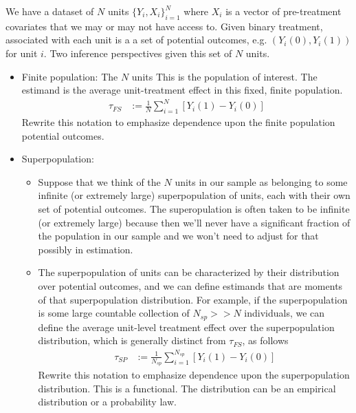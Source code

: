 \documentclass[12pt]{article}
\theoremstyle{plain}
\theoremstyle{definition}
\theoremstyle{remark}
\newcommand{\sumiN}{\sum^N_{i=1}}
\begin{document}
We have a dataset of $N$ units $\{Y_i,X_i\}_{i=1}^N$ where
$X_i$ is a vector of pre-treatment covariates that we may or may not
have access to.
Given binary treatment,
associated with each unit is a a set of potential outcomes,
e.g. $(Y_i(0),Y_i(1))$ for unit $i$.
Two inference perspectives given this set of $N$ units.
\begin{itemize}
  \item Finite population:
    The $N$ units
    This is the population of interest.
    The estimand is the average unit-treatment effect in this fixed,
    finite population.
    \begin{align*}
      \tau_{FS}
      &:=
      \frac{1}{N}
      \sumiN
      [Y_i(1)-Y_i(0)]
    \end{align*}
    Rewrite this notation to emphasize dependence upon the finite
    population potential outcomes.

  \item
    Superpopulation:
    \begin{itemize}
      \item Suppose that we think of the $N$ units in our sample as
        belonging to some infinite (or extremely large) superpopulation
        of units, each with their own set of potential outcomes.
        The superopulation is often taken to be infinite (or extremely
        large) because then we'll never have a significant fraction of
        the population in our sample and we won't need to adjust for
        that possibly in estimation.

      \item
        The superpopulation of units can be characterized by their
        distribution over potential outcomes, and we can define
        estimands that are moments of that superpopulation distribution.
        For example, if the superpopulation is some large countable
        collection of $N_{sp}>>N$ individuals, we can define the average
        unit-level treatment effect over the superpopulation
        distribution, which is generally distinct from $\tau_{FS}$, as
        follows
        \begin{align*}
          \tau_{SP}
          &:=
          \frac{1}{N_{sp}}
          \sum_{i=1}^{N_{sp}}
          [Y_i(1)-Y_i(0)]
        \end{align*}
        Rewrite this notation to emphasize dependence upon the
        superpopulation distribution. This is a functional.
        The distribution can be an empirical distribution or a
        probability law.


\end{itemize}
\end{itemize}
\end{document}
